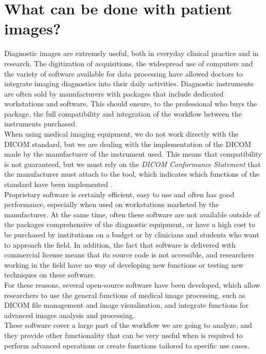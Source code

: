 \section{What can be done with patient images?}
Diagnostic images are extremely useful, both in everyday clinical practice and in research.
The digitization of acquisitions, the widespread use of computers and the variety of software available for data processing have allowed doctors to integrate imaging diagnostics into their daily activities. Diagnostic instruments are often sold by manufacturers with packages that include dedicated workstations and software. This should ensure, to the professional who buys the package, the full compatibility and integration of the workflow between the instruments purchased. \\
When using medical imaging equipment, we do not work directly with the DICOM standard, but we are dealing with the implementation of the DICOM made by the manufacturer of the instrument used. This means that compatibility is not guaranteed, but we must rely on the \emph{DICOM Conformance Statement} that the manufacturer must attach to the tool, which indicates which functions of the standard have been implemented \parencite{Reference25}. \\
Proprietary software is certainly efficient, easy to use and often has good performance, especially when used on workstations marketed by the manufacturer. At the same time, often these software are not available outside of the packages comprehensive of the diagnostic equipment, or have a high cost to be purchased by institutions on a budget or by clinicians and students who want to approach the field. In addition, the fact that software is delivered with commercial license means that its source code is not accessible, and researchers working in the field have no way of developing new functions or testing new techniques on these software. \\
For these reasons, several open-source software have been developed, which allow researchers to use the general functions of medical image processing, such as DICOM file management and image visualization, and integrate functions for advanced images analysis and processing. \\
These software cover a large part of the workflow we are going to analyze, and they provide other functionality that can be very useful when is required to perform advanced operations or create functions tailored to specific use cases.

